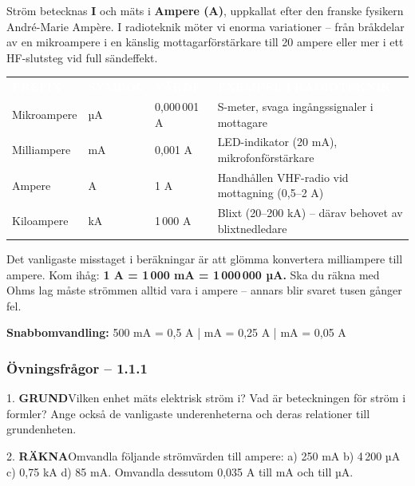 \documentclass[a4paper,11pt,twoside]{book}
\newcommand{\tblhdr}[1]{\cellcolor{greydark}\textcolor{white}{\headingfont\bfseries\footnotesize\MakeUppercase{#1}}}
\newcommand{\qgrund}{\colorbox{greenpale}{\textcolor{greendark}{\headingfont\bfseries\tiny GRUND}}}
\newcommand{\qrakna}{\colorbox{bluepale}{\textcolor{bluedark}{\headingfont\bfseries\tiny RÄKNA}}}
\begin{document}
Ström betecknas \textbf{I} och mäts i \textbf{Ampere (A)}, uppkallat efter den franske fysikern André-Marie Ampère. I radioteknik möter vi enorma variationer – från bråkdelar av en mikroampere i en känslig mottagarförstärkare till 20 ampere eller mer i ett HF-slutsteg vid full sändeffekt.

\begin{center}
\begin{tabular}{llll}
\rowcolor{greydark}
\tblhdr{Prefix} & \tblhdr{Symbol} & \tblhdr{Värde} & \tblhdr{Exempel i radioteknik} \\
Mikroampere & µA & 0,000\,001 A & S-meter, svaga ingångssignaler i mottagare \\
\rowcolor{greylight}
Milliampere & mA & 0,001 A & LED-indikator (20 mA), mikrofonförstärkare \\
Ampere & A & 1 A & Handhållen VHF-radio vid mottagning (0,5–2 A) \\
\rowcolor{greylight}
Kiloampere & kA & 1\,000 A & Blixt (20–200 kA) – därav behovet av blixtnedledare \\
\end{tabular}
\end{center}

Det vanligaste misstaget i beräkningar är att glömma konvertera milliampere till ampere. Kom ihåg: \textbf{1 A = 1\,000 mA = 1\,000\,000 µA.} Ska du räkna med Ohms lag måste strömmen alltid vara i ampere – annars blir svaret tusen gånger fel.

\textbf{Snabbomvandling:} 500 mA = 0,5 A \quad |  mA = 0,25 A \quad |  mA = 0,05 A

\subsubsection*{Övningsfrågor – 1.1.1}

\begin{qblock}{1.}
\qgrund\quad Vilken enhet mäts elektrisk ström i? Vad är beteckningen för ström i formler? Ange också de vanligaste underenheterna och deras relationer till grundenheten.
\end{qblock}

\begin{qblock}{2.}
\qrakna\quad Omvandla följande strömvärden till ampere: a) 250 mA \quad b) 4\,200 µA \quad c) 0,75 kA \quad d) 85 mA. Omvandla dessutom 0,035 A till mA och till µA.
\end{qblock}

\end{document}
